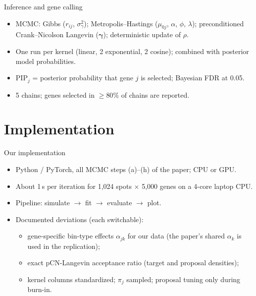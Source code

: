 \documentclass[aspectratio=169,11pt]{beamer}
\begin{document}
\begin{frame}{Inference and gene calling}
  \begin{itemize}
    \item MCMC: Gibbs ($r_{ij}$, $\sigma^2_\gamma$); Metropolis--Hastings ($\mu_{0j}$, $\alpha$, $\phi$, $\lambda$);
          preconditioned Crank--Nicolson Langevin ($\boldsymbol\gamma$); deterministic update of $\rho$.
    \item One run per kernel (linear, 2 exponential, 2 cosine); combined with posterior model probabilities.
    \item PIP$_j$ = posterior probability that gene $j$ is selected; Bayesian FDR at 0.05.
    \item 5 chains; genes selected in $\geq 80\%$ of chains are reported.
  \end{itemize}
\end{frame}

\section{Implementation}

\begin{frame}{Our implementation}
  \begin{itemize}
    \item Python / PyTorch, all MCMC steps (a)--(h) of the paper; CPU or GPU.
    \item About 1\,s per iteration for 1{,}024 spots $\times$ 5{,}000 genes on a 4-core laptop CPU.
    \item Pipeline: simulate $\rightarrow$ fit $\rightarrow$ evaluate $\rightarrow$ plot.
    \item Documented deviations (each switchable):
      \begin{itemize}
        \item gene-specific bin-type effects $\alpha_{jk}$ for our data (the paper's shared $\alpha_k$ is used in the replication);
        \item exact pCN-Langevin acceptance ratio (target and proposal densities);
        \item kernel columns standardized; $\pi_j$ sampled; proposal tuning only during burn-in.
      \end{itemize}
  \end{itemize}
\end{frame}

\end{document}
